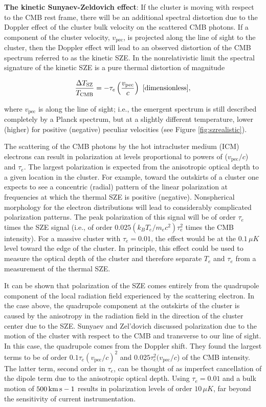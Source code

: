 \documentclass[a4paper,11pt]{article}
\begin{document}
{\noindent}\textbf{The kinetic Sunyaev-Zeldovich effect}: If the cluster is moving with respect to the CMB rest frame, there will be an additional spectral distortion due to the Doppler effect of the cluster bulk velocity on the scattered CMB photons. If a component of the cluster velocity, $v_\mathrm{pec}$, is projected along the line of sight to the cluster, then the Doppler effect will lead to an observed distortion of the CMB spectrum referred to as the kinetic SZE. In the nonrelativistic limit the spectral signature of the kinetic SZE is a pure thermal distortion of magnitude

\begin{align*}
    \frac{\Delta T_\mathrm{SZ}}{T_\mathrm{CMB}} = -\tau_e \left(\frac{v_\mathrm{pec}}{c}\right) ~ [{\rm dimensionless}],
\end{align*}

{\noindent}where $v_\mathrm{pec}$ is along the line of sight; i.e., the emergent spectrum is still described completely by a Planck spectrum, but at a slightly different temperature, lower (higher) for positive (negative) peculiar velocities (see Figure \ref{fig:szrealistic}).

{\noindent}The scattering of the CMB photons by the hot intracluster medium (ICM) electrons can result in polarization at levels proportional to powers of ($v_\mathrm{pec}/c$) and $\tau_e$. The largest polarization is expected from the anisotropic optical depth to a given location in the cluster. For example, toward the outskirts of a cluster one expects to see a concentric (radial) pattern of the linear polarization at frequencies at which the thermal SZE is positive (negative). Nonspherical morphology for the electron distributions will lead to considerably complicated polarization patterns. The peak polarization of this signal will be of order $\tau_e$ times the SZE signal (i.e., of order $0.025(k_BT_e/m_ec^2)\tau_e^2$ times the CMB intensity). For a massive cluster with $\tau_e=0.01$, the effect would be at the $0.1\,{\mu K}$ level toward the edge of the cluster. In principle, this effect could be used to measure the optical depth of the cluster and therefore separate $T_e$ and $\tau_e$ from a measurement of the thermal SZE.

{\noindent}It can be shown that polarization of the SZE comes entirely from the quadrupole component of the local radiation field experienced by the scattering electron. In the case above, the quadrupole component at the outskirts of the cluster is caused by the anisotropy in the radiation field in the direction of the cluster center due to the SZE. Sunyaev and Zel'dovich discussed polarization due to the motion of the cluster with respect to the CMB and transverse to our line of sight. In this case, the quadrupole comes from the Doppler shift. They found the largest terms to be of order $0.1\tau_e(v_\mathrm{pec}/c)^2$ and $0.025\tau_e^2(v_\mathrm{pec}/c$) of the CMB intensity. The latter term, second order in $\tau_e$, can be thought of as imperfect cancellation of the dipole term due to the anisotropic optical depth. Using $\tau_e=0.01$ and a bulk motion of $500\,{\rm km\,s-1}$ results in polarization levels of order $10\,{\mu K}$, far beyond the sensitivity of current instrumentation.
\end{document}
